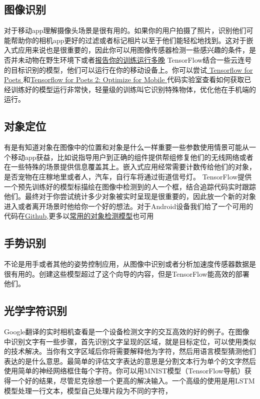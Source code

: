 \subsection{图像识别}
对于移动app理解摄像头场景是很有用的。如果你的用户拍摄了照片，识别他们可能帮助你的相机app更好的过滤或者标记相片以至于他们能轻松地找到。这对于嵌入式应用来说也是很重要的，因此你可以用图像传感器检测一些感兴趣的条件，是否并未动物在野生环境下或者\href{https://svds.com/tensorflow-image-recognition-raspberry-pi/}{报告你的训练运行多晚}
TensorFlow结合一些云连号的目标识别的模型，他们可以运行在你的移动设备上。你可以尝试\href{https://codelabs.developers.google.com/codelabs/tensorflow-for-poets/index.html?hl=zh-cn#0}{ Tensorflow for Poets }和\href{https://codelabs.developers.google.com/codelabs/tensorflow-for-poets-2/index.html?hl=zh-cn#0}{Tensorflow for Poets 2: Optimize for Mobile }代码实验室查看如何获取已经训练好的模型运行非常快，轻量级的训练叫它识别特殊物体，优化他在手机端的运行。
\subsection{对象定位}
有是有知道对象在图像中的位置和对象是什么一样重要一些参数使用情景可能从一个移动app获益，比如说指导用户到正确的组件提供帮组修复他们的无线网络或者在一些特殊的场景提供信息覆盖其上。嵌入式应用经常需要计数传给他们的对象，是否宠物在庄稼地里或者人，汽车，自行车将通过街道信号灯。
TensorFlow提供一个预先训练好的模型标描绘在图像中检测到的人一个框，结合追踪代码实时跟踪他们。最终对于你尝试统计多少对象被实时呈现是很重要的，因此放一个新的对象进入或者离开场景时他给你一个好的想法。对于Android设备我们给了一个可用的代码在\href{https://github.com/tensorflow/tensorflow/tree/master/tensorflow/examples/android}{Github},更多以\href{https://github.com/tensorflow/models/tree/master/object_detection/README.md}{常用的对象检测模型}也可用
\subsection{手势识别}
不论是用手或者其他的姿势控制应用，从图像中识别或者分析加速度传感器数据是很有用的。创建这些模型超过了这个向导的内容，但是TensorFlow能高效的部署他们。
\subsection{光学字符识别}
Google翻译的实时相机查看是一个设备检测文字的交互高效的好的例子。在图像中识别文字有一些步骤，首先识别文字呈现的区域，就是目标定位，可以使用类似的技术解决。当你有文字区域后你将需要解释他为字符，然后用语言模型猜测他们表达的是什么意思。最简单的评估文字表达的意思是分割文本行为单个的文字然后使用简单的神经网络框住每个字符。你可以用MNIST模型（TensorFlow导航）获得一个好的结果，尽管尼克徐想一个更高的解决输入。一个高级的使用是用LSTM模型处理一行文本，模型自己处理片段为不同的字符，
